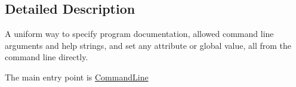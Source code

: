 \subsection{Detailed Description}
A uniform way to specify program documentation, allowed command line arguments and help strings, and set any attribute or global value, all from the command line directly.

The main entry point is \hyperlink{classns3_1_1CommandLine}{Command\+Line} 